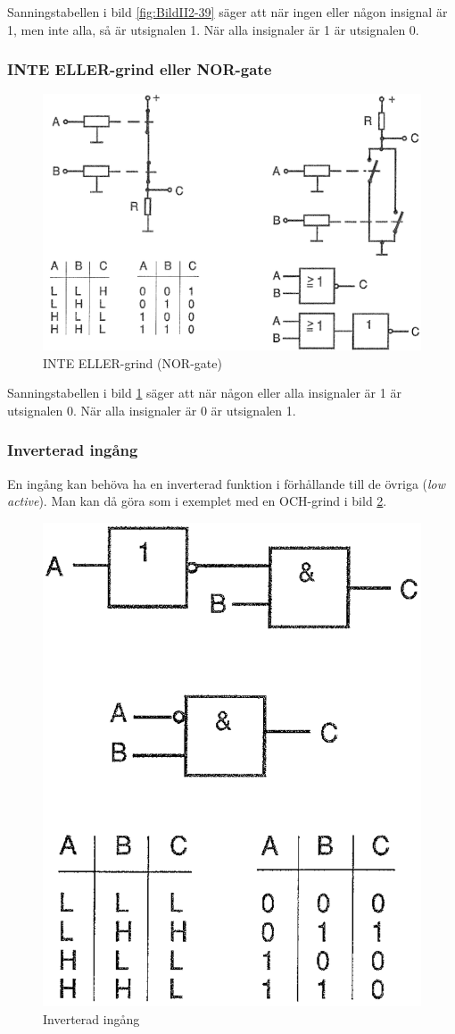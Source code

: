 Sanningstabellen i bild \ref{fig:BildII2-39} säger att när ingen eller
någon insignal är 1, men inte alla, så är utsignalen 1. När alla
insignaler är 1 är utsignalen 0.

\subsubsection{INTE ELLER-grind eller NOR-gate}

\begin{figure}
\includegraphics[width=\textwidth]{images/cropped_pdfs/bild_2_2-40.pdf}
\caption{INTE ELLER-grind (NOR-gate)}
\label{fig:BildII2-40}
\end{figure}

Sanningstabellen i bild \ref{fig:BildII2-40} säger att när någon eller alla
insignaler är 1 är utsignalen 0.
När alla insignaler är 0 är utsignalen 1.

\subsubsection{Inverterad ingång}

En ingång kan behöva ha en inverterad funktion i förhållande till de
övriga (\emph{low active}). Man kan då göra som i exemplet med en
OCH-grind i bild \ref{fig:BildII2-41}.

\begin{figure}
\includegraphics[width=.4\textwidth]{images/cropped_pdfs/bild_2_2-41.pdf}
\caption{Inverterad ingång}
\label{fig:BildII2-41}
\end{figure}

